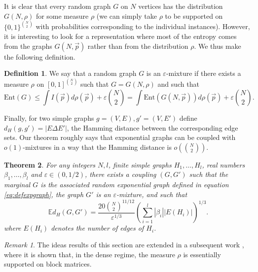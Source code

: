 \documentclass[12pt]{article}
\def \EE {\mathbb E}
\def \eps {\varepsilon}
\newtheorem{theorem}{Theorem}
\theoremstyle{definition}
\newtheorem{definition}[theorem]{Definition}
\theoremstyle{remark}
\newtheorem{remark}{Remark}
\begin{document}
It is clear that every random graph $G$ on $N$ vertices has the distribution $G(N,\rho)$ for some measure $\rho$ (we can simply take $\rho$ to be supported on $\{0,1\}^{{N \choose 2}}$ with probabilities corresponding to the individual instances). However, it is interesting to look for a representation where most of the entropy comes from the graphs $G(N,\vec p)$ rather than from the distribution $\rho$. We thus make the following definition.
\begin{definition}
	We say that a random graph $G$ is an $\eps$-mixture if there exists a measure $\rho$ on $[0,1]^{{N \choose 2}}$ such that $G = G(N,\rho)$ and such that
	$$
	\mathrm{Ent}(G) \leq \int I(\vec p) d \rho(\vec p) + \eps {N \choose 2} = \int \mathrm{Ent}(G(N, \vec p)) d \rho(\vec p) + \eps {N \choose 2}.
	$$
\end{definition}

Finally, for two simple graphs $g=(V,E),g'=(V,E')$ define $d_H(g,g') = |E \Delta E'|$, the Hamming distance between the corresponding edge sets. Our theorem roughly says that exponential graphs can be coupled with $o(1)$-mixtures in a way that the Hamming distance is $o\left ( {N \choose 2} \right )$.
\begin{theorem} \label{thm:exponential}
	For any integers $N,l$, finite simple graphs $H_1,\dots,H_l$, real numbers $\beta_1,\dots,\beta_l$ and $\eps \in (0, 1/2)$, there exists a coupling $(G,G')$ such that the marginal $G$ is the associated random exponential graph defined in equation \eqref{eq:defexpgraph}, the graph $G'$ is an $\eps$-mixture, and such that
	$$
	\EE d_H( G, G' ) = \frac{20 {N \choose 2}^{11/12}}{\eps^{1/3}} \left ( \sum_{i=1}^l |\beta_i| |E(H_i)| \right )^{1/3}.
	$$ 
	where $E(H_i)$ denotes the number of edges of $H_i$.
\end{theorem}

\begin{remark}
The ideas results of this section are extended in a subsequent work \cite{EldanGross-Expographs}, where it is shown that, in the dense regime, the measure $\rho$ is essentially supported on block matrices.
\end{remark}
\end{document}
